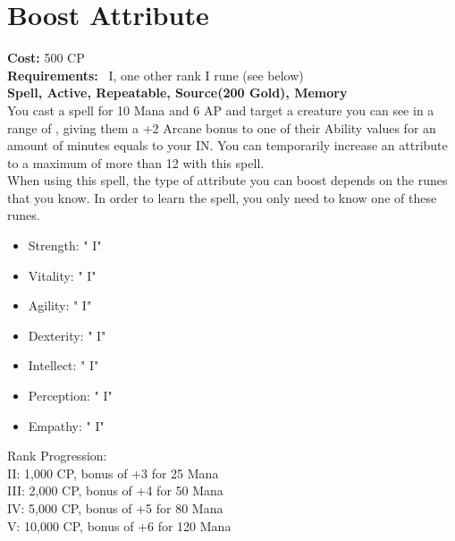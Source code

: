 \section{Boost Attribute}\label{spell:boostAttribute}
\textbf{Cost:} 500 CP\\
\textbf{Requirements:}~ I, one other rank I rune (see below)\\
\textbf{Spell, Active, Repeatable, Source(200 Gold), Memory}\\
You cast a spell for 10 Mana and 6 AP and target a creature you can see in a range of , giving them a +2 Arcane bonus to one of their Ability values for an amount of minutes equals to your IN.
You can temporarily increase an attribute to a maximum of more than 12 with this spell.\\
When using this spell, the type of attribute you can boost depends on the runes that you know.
In order to learn the spell, you only need to know one of these runes.\\
\begin{itemize}
    \item Strength: " I"
    \item Vitality: " I"
    \item Agility: " I"
    \item Dexterity: " I"
    \item Intellect: " I"
    \item Perception: " I"
    \item Empathy: " I"
\end{itemize}
Rank Progression:\\
II: 1,000 CP, bonus of +3 for 25 Mana\\
III: 2,000 CP, bonus of +4 for 50 Mana\\
IV: 5,000 CP, bonus of +5 for 80 Mana\\
V: 10,000 CP, bonus of +6 for 120 Mana\\